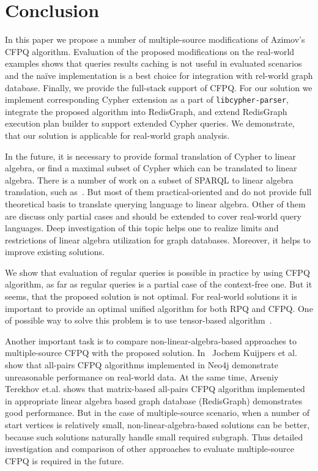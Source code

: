 \section{Conclusion}

In this paper we propose a number of multiple-source modifications of Azimov's CFPQ algorithm.
Evaluation of the proposed modifications on the real-world examples shows that queries results caching is not useful in evaluated scenarios and the na\"{i}ve implementation is a best choice for integration with rel-world graph database.  
Finally, we provide the full-stack support of CFPQ.
For our solution we implement corresponding Cypher extension as a part of \texttt{libcypher-parser}, integrate the proposed algorithm into RedisGraph, and extend RedisGraph execution plan builder to support extended Cypher queries.
We demonstrate, that our solution is applicable for real-world graph analysis.

In the future, it is necessary to provide formal translation of Cypher to linear algebra, or find a maximal subset of Cypher which can be translated to linear algebra.
There is a number of work on a subset of SPARQL to linear algebra translation, such as~\cite{10.14778/3229863.3236239,10.1007/978-3-642-34002-4_36,10.1145/3302424.3303962,DBLP:journals/corr/MetzlerM15a}.
But most of them practical-oriented and do not provide full theoretical basis to translate querying language to linear algebra.
Other of them are discuss only partial cases and should be extended to cover real-world query languages. 
Deep investigation of this topic helps one to realize limits and restrictions of linear algebra utilization for graph databases.
Moreover, it helps to improve existing solutions.

We show that evaluation of regular queries is possible in practice by using CFPQ algorithm, as far as regular queries is a partial case of the context-free one.
But it seems, that the proposed solution is not optimal. 
For real-world solutions it is important to provide an optimal unified algorithm for both RPQ and CFPQ.
One of possible way to solve this problem is to use tensor-based algorithm~\cite{10.1007/978-3-030-54832-2_6}.

Another important task is to compare non-linear-algebra-based approaches to multiple-source CFPQ with the proposed solution. 
In~\cite{Kuijpers:2019:ESC:3335783.3335791} Jochem Kuijpers et al. show that all-pairs CFPQ algorithms implemented in Neo4j demonstrate unreasonable performance on real-world data.
At the same time, Arseniy Terekhov et.al. shows that matrix-based all-pairs CFPQ algorithm implemented in appropriate linear algebra based graph database (RedisGraph) demonstrates good performance.
But in the case of multiple-source scenario, when a number of start vertices is relatively small, non-linear-algebra-based solutions can be better, because such solutions naturally handle small required subgraph.
Thus detailed investigation and comparison of other approaches to evaluate multiple-source CFPQ is required in the future.